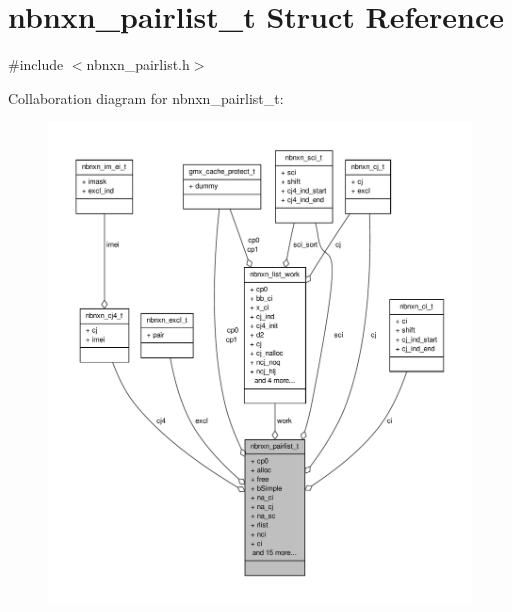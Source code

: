 \hypertarget{structnbnxn__pairlist__t}{\section{nbnxn\-\_\-pairlist\-\_\-t \-Struct \-Reference}
\label{structnbnxn__pairlist__t}
}


{\ttfamily \#include $<$nbnxn\-\_\-pairlist.\-h$>$}



\-Collaboration diagram for nbnxn\-\_\-pairlist\-\_\-t\-:
\nopagebreak
\begin{figure}[H]
\begin{center}
\leavevmode
\includegraphics[width=350pt]{structnbnxn__pairlist__t__coll__graph}
\end{center}
\end{figure}
